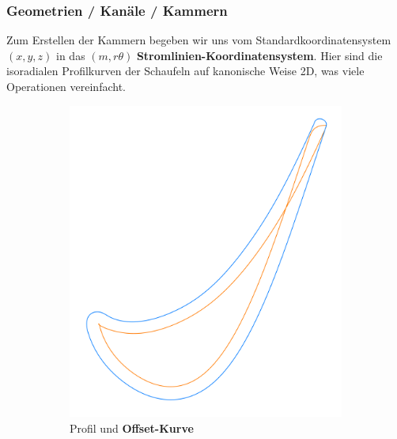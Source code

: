 \documentclass[8pt, aspectratio=169]{beamer}
\begin{document}
\begin{frame}
	\frametitle{Geometrien / Kanäle / Kammern}
	\vspace{-0.25cm}\hspace{-0.5cm}
	\centering
	\begin{minipage}[t]{\textwidth}
		Zum Erstellen der Kammern begeben wir uns vom Standardkoordinatensystem $(x,y,z)$ in das $(m, r\theta)$ \textbf{Stromlinien-Koordinatensystem}. Hier sind die isoradialen Profilkurven der Schaufeln auf kanonische Weise 2D, was viele Operationen vereinfacht.
		\begin{figure}[H]
			\centering
			\begin{subfigure}{.32\textwidth}
				\includegraphics[width=\textwidth]{../../tec/shrinking/61.png}
				\caption{Profil und \textbf{Offset-Kurve}}
			\end{subfigure}
			\begin{subfigure}{.32\textwidth}

\end{subfigure}
\end{figure}
\end{minipage}
\end{frame}
\end{document}
